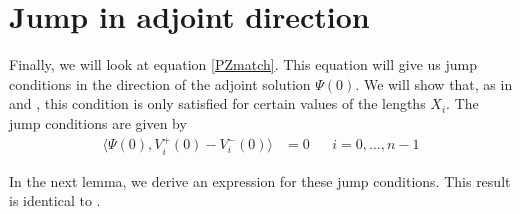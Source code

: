 \documentclass[thesis.tex]{subfiles}
\begin{document}
\section{Jump in adjoint direction}

Finally, we will look at equation \eqref{PZmatch}. This equation will give us jump conditions in the direction of the adjoint solution $\Psi(0)$. We will show that, as in \cite{Sandstede1998} and \cite{SandstedeStrut}, this condition is only satisfied for certain values of the lengths $X_i$. The jump conditions are given by
\begin{align}\label{PZmatch2}
\langle \Psi(0), V_i^+(0) - V_i^-(0) \rangle &= 0 && i = 0, \dots, n-1
\end{align}

In the next lemma, we derive an expression for these jump conditions. This result is identical to \cite[(3.9)]{SandstedeStrut}.

\end{document}
